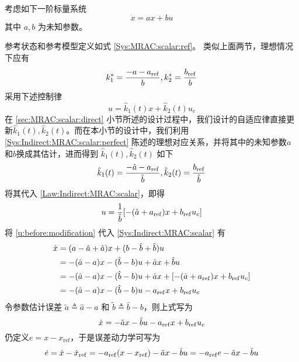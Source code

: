 考虑如下一阶标量系统
\begin{equation}
  \dot{x} = a x + b  u \label{Sys:Indirect:MRAC:scalar}
\end{equation}
其中 $a, b$ 为未知参数。

参考状态和参考模型定义如式 \eqref{Sys:MRAC:scalar:ref}。
类似上面两节，理想情况下应有
\begin{equation}
  k^{\ast}_1 = \frac{-a - a_{\operatorname{ref}}}{b}, k^{\ast}_2 = \frac{b_{\operatorname{ref}}}{b}
  \label{Sys:Indirect:MRAC:scalar:perfect}
\end{equation}
采用下述控制律
\begin{equation}
  u = \hat{k}_1 (t) x + \hat{k}_2 (t) u_c\label{Law:Indirect:MRAC:scalar}
\end{equation}
在 \ref{sec:MRAC:scalar:direct} 小节所述的设计过程中，我们设计的自适应律直接更新$\hat{k}_1 (t), \hat{k}_2 (t)$。而在本小节的设计中，我们利用
\eqref{Sys:Indirect:MRAC:scalar:perfect} 陈述的理想对应关系，并将其中的未知参数$a$和$b$换成其估计，进而得到 $\hat{k}_1 (t), \hat{k}_2 (t)$ 如下
\[ \hat{k}_1 (t) = \frac{-\hat{a} - a_{\operatorname{ref}}}{\hat{b}},
  \hat{k}_2 (t) =\frac{b_{\operatorname{ref}}}{\hat{b}} \]
将其代入 \eqref{Law:Indirect:MRAC:scalar}，即得
\begin{equation}
  u = \frac{1}{\hat{b}} [-(\hat{a} + a_{\operatorname{ref}}) x + b_{\operatorname{ref}} u_c] \label{u:before:modification}
\end{equation}
将 \eqref{u:before:modification} 代入 \eqref{Sys:Indirect:MRAC:scalar} 有
\begin{align}
  \dot{x} & = (a - \hat{a} + \hat{a})  x + (b - \hat{b} + \hat{b} ) u \nonumber             \\
          & = -(\hat{a} - a)  x -(\hat{b} -b)  u + \hat{a} x + \hat{b} u \nonumber          \\
          & = -(\hat{a} - a)  x -(\hat{b} -b)  u + \hat{a} x
  + [-(\hat{a} + a_{\operatorname{ref}}) x +  b_{\operatorname{ref}} u_c]\nonumber                                \\
          & = -(\hat{a} - a)  x -(\hat{b} -b)  u -a_{\operatorname{ref}} x + b_{\operatorname{ref}} u_c \nonumber
\end{align}
令参数估计误差 $\tilde{a}  \triangleq \hat{a} - a$ 和 $\tilde{b}  \triangleq \hat{b} -b$，则上式写为
\begin{equation*}
  \dot{x}  = -\tilde{a}  x - \tilde{b}  u - a_{\operatorname{ref}} x +
  b_{\operatorname{ref}} u_c
\end{equation*}
仍定义$e=x-x_{\operatorname{ref}}$，于是误差动力学可写为
\begin{equation}
  \dot{e} =\dot{x}-\dot{x}_{\operatorname{ref}}= - a_{\operatorname{ref}} (x-x_{\operatorname{ref}})- \tilde{a}  x - \tilde{b}u= -a_{\operatorname{ref}} e - \tilde{a}  x - \tilde{b}u\label{error_dyn_indirect}
\end{equation}

